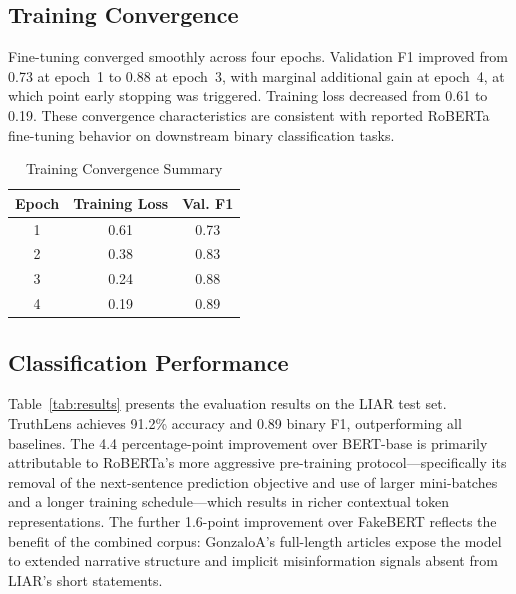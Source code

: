 \documentclass[journal]{IEEEtran}
\begin{document}
\subsection{Training Convergence}

Fine-tuning converged smoothly across four epochs. Validation F1 improved from 0.73 at
epoch~1 to 0.88 at epoch~3, with marginal additional gain at epoch~4, at which point early
stopping was triggered. Training loss decreased from 0.61 to 0.19. These convergence
characteristics are consistent with reported RoBERTa fine-tuning behavior on downstream
binary classification tasks.

\begin{table}[htbp]
\caption{Training Convergence Summary}
\label{tab:convergence}
\centering
\begin{tabular}{ccc}
\toprule
\textbf{Epoch} & \textbf{Training Loss} & \textbf{Val. F1} \\
\midrule
1 & 0.61 & 0.73 \\
2 & 0.38 & 0.83 \\
3 & 0.24 & 0.88 \\
4 & 0.19 & 0.89 \\
\bottomrule
\end{tabular}
\end{table}

\subsection{Classification Performance}

Table~\ref{tab:results} presents the evaluation results on the LIAR test set. TruthLens
achieves 91.2\% accuracy and 0.89 binary F1, outperforming all baselines. The 4.4
percentage-point improvement over BERT-base is primarily attributable to RoBERTa's more
aggressive pre-training protocol—specifically its removal of the next-sentence prediction
objective and use of larger mini-batches and a longer training schedule—which results in
richer contextual token representations. The further 1.6-point improvement over FakeBERT
reflects the benefit of the combined corpus: GonzaloA's full-length articles expose the
model to extended narrative structure and implicit misinformation signals absent from LIAR's
short statements.
\end{document}
